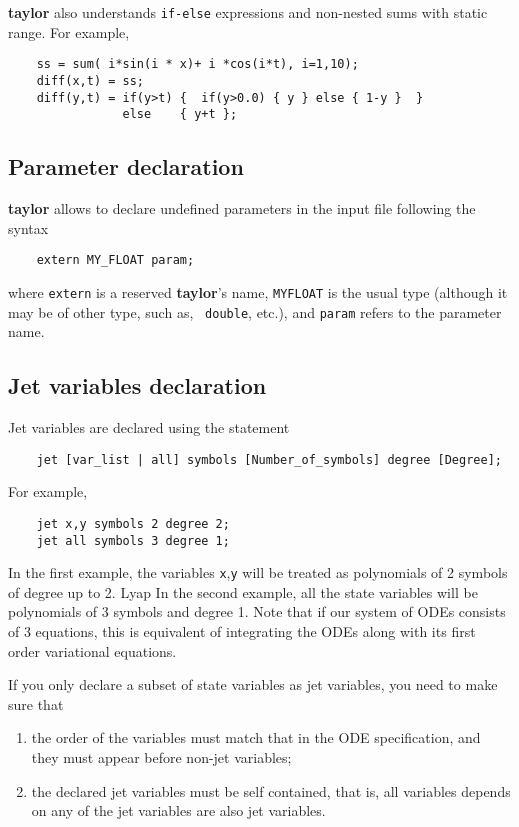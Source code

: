 \documentclass[10pt]{article}
\theoremstyle{remark}
\newcommand{\taylorname}{{\bf taylor}}
\newcommand{\myfloat}{{\tt MY\symbol{95}FLOAT}}
\begin{document}
\medskip 

\taylorname{} also understands {\tt if-else} expressions and
non-nested sums with static range. For example,
\begin{verbatim}
    ss = sum( i*sin(i * x)+ i *cos(i*t), i=1,10);
    diff(x,t) = ss;
    diff(y,t) = if(y>t) {  if(y>0.0) { y } else { 1-y }  }
                else    { y+t };
\end{verbatim}

\subsection*{Parameter declaration}
\taylorname{} allows to declare undefined parameters in the input file
following the syntax
\begin{verbatim}
    extern MY_FLOAT param;
\end{verbatim}
where {\tt extern} is a reserved \taylorname{}'s name, \myfloat{} is
the usual type (although it may be of other type, such as, {\tt
  double}, etc.), and {\tt param} refers to the parameter name.

\subsection*{Jet variables declaration}
Jet variables are declared using the statement
\begin{verbatim}
    jet [var_list | all] symbols [Number_of_symbols] degree [Degree];
\end{verbatim}
For example,
\begin{verbatim}
    jet x,y symbols 2 degree 2;
    jet all symbols 3 degree 1;
\end{verbatim}
In the first example, the variables {\tt x},{\tt y} will be treated as
polynomials of 2 symbols of degree up to 2.
Lyap
In the second example, all the state variables will be polynomials of
3 symbols and degree 1. Note that if our system of ODEs consists of 3
equations, this is equivalent of integrating the ODEs along with its
first order variational equations.


\bigskip

If you only declare a subset of state variables as jet variables, you
need to make sure that
\begin{enumerate}
\renewcommand{\theenumi}{A\arabic{enumi}}
\renewcommand{\labelenumi}{\theenumi.)}
    \item\label{A1} the order of the variables must match that in the
      ODE specification, and they must appear before non-jet
      variables;
    \item\label{A2} the declared jet variables must be self contained,
      that is, all variables depends on any of the jet variables are
      also jet variables.
\end{enumerate}
\end{document}

